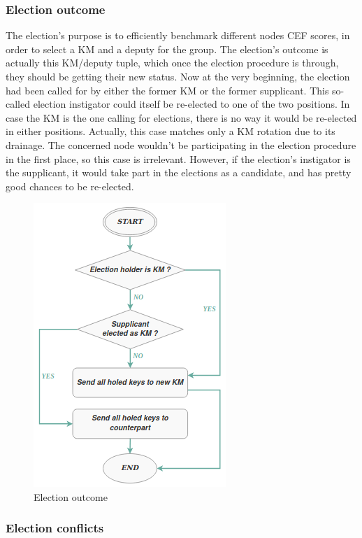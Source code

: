\subsubsection{Election outcome}

The election’s purpose is to efficiently benchmark different nodes CEF scores, in order to select a KM and a deputy for the group. The election’s outcome is actually this KM/deputy tuple, which once the election procedure is through, they should be getting their new status. Now at the very beginning, the election had been called for by either the former KM or the former supplicant. This so-called election instigator could itself be re-elected to one of the two positions. In case the KM is the one calling for elections, there is no way it would be re-elected in either positions. Actually, this case matches only a KM rotation due to its drainage. The concerned node wouldn’t be participating in the election procedure in the first place, so this case is irrelevant. However, if the election’s instigator is the supplicant, it would take part in the elections as a candidate, and has pretty good chances to be re-elected.

\begin{figure}[htbp]
	\centerline{\includegraphics[scale=0.70]{figures/election_outcome.png}}
	\caption{Election outcome}
	\label{fig:election_outcome}
\end{figure}

\subsubsection{Election conflicts}

